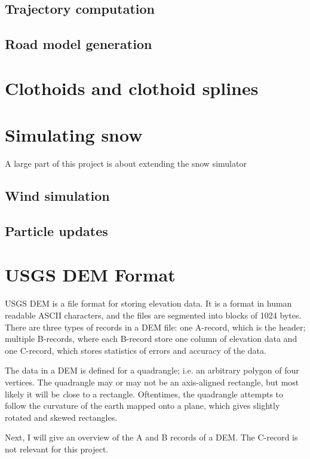 \subsection{Trajectory computation}

\subsection{Road model generation}


\section{Clothoids and clothoid splines}

\section{Simulating snow}
A large part of this project is about extending the snow simulator 

\subsection{Wind simulation}

\subsection{Particle updates}


\section{USGS DEM Format}
USGS DEM is a file format for storing elevation data. It is a format in human readable ASCII characters, and the files are segmented into blocks of 1024 bytes. There are three types of records in a DEM file: one A-record, which is the header; multiple B-records, where each B-record store one column of elevation data and one C-record, which stores statistics of errors and accuracy of the data.

The data in a DEM is defined for a quadrangle; i.e. an arbitrary polygon of four vertices. The quadrangle may or may not be an axis-aligned rectangle, but most likely it will be {\textit close} to a rectangle. Oftentimes, the quadrangle attempts to follow the curvature of the earth mapped onto a plane, which gives slightly rotated and skewed rectangles.

Next, I will give an overview of the A and B records of a DEM. The C-record is not relevant for this project.

